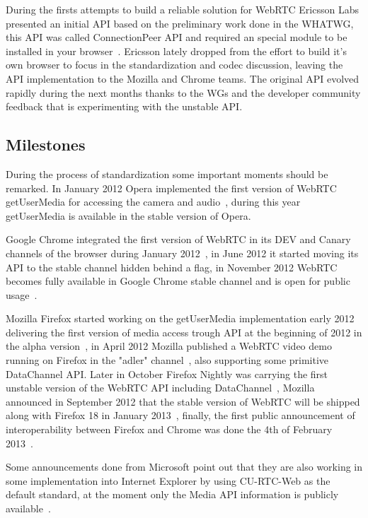 During the firsts attempts to build a reliable solution for WebRTC Ericsson Labs presented an initial API based on the preliminary work done in the WHATWG, this API was called ConnectionPeer API and required an special module to be installed in your browser~\cite{ericssonwebrtc}. Ericsson lately dropped from the effort to build it's own browser to focus in the standardization and codec discussion, leaving the API implementation to the Mozilla and Chrome teams. The original API evolved rapidly during the next months thanks to the WGs and the developer community feedback that is experimenting with the unstable API.

\subsection{Milestones}

During the process of standardization some important moments should be remarked. In January 2012 Opera implemented the first version of WebRTC getUserMedia for accessing the camera and audio~\cite{operaannouncement}, during this year getUserMedia is available in the stable version of Opera. 

Google Chrome integrated the first version of WebRTC in its DEV and Canary channels of the browser during January 2012~\cite{chromeannouncement}, in June 2012 it started moving its API to the stable channel hidden behind a flag, in November 2012 WebRTC becomes fully available in Google Chrome stable channel and is open for public usage~\cite{chromestable}. 

Mozilla Firefox started working on the getUserMedia implementation early 2012 delivering the first version of media access trough API at the beginning of 2012 in the alpha version~\cite{mozillablog}, in April 2012 Mozilla published a WebRTC video demo running on Firefox in the "adler" channel~\cite{mozillawebrtc}, also supporting some primitive DataChannel API. Later in October Firefox Nightly was carrying the first unstable version of the WebRTC API including DataChannel~\cite{mozillafinal}, Mozilla announced in September 2012 that the stable version of WebRTC will be shipped along with Firefox 18 in January 2013~\cite{mozillacomming}, finally, the first public announcement of interoperability between Firefox and Chrome was done the 4th of February 2013~\cite{chromefirefoxinterop}.

Some announcements done from Microsoft point out that they are also working in some implementation into Internet Explorer by using CU-RTC-Web as the default standard, at the moment only the Media API information is publicly available~\cite{microsoftcapture}.

